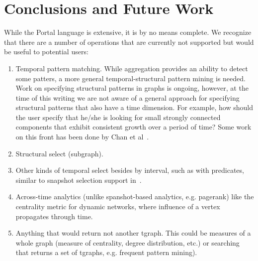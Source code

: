 \section{Conclusions and Future Work}
\label{sec:conc}

While the Portal language is extensive, it is by no means complete. We
recognize that there are a number of operations that are currently not
supported but would be useful to potential users:

\begin{enumerate}
\item Temporal pattern matching.  While aggregation provides an
  ability to detect some patters, a more general temporal-structural
  pattern mining is needed.  Work on specifying structural patterns in
  graphs is ongoing, however, at the time of this writing we are not
  aware of a general approach for specifying structural patterns that
  also have a time dimension.  For example, how should the user
  specify that he/she is looking for small strongly connected
  components that exhibit consistent growth over a period of time?
  Some work on this front has been done by Chan et
  al~\cite{Chan2008,Kan2009}.
\item Structural select (subgraph).  
\item Other kinds of temporal select besides by interval, such as with
  predicates, similar to snapshot selection support
  in~\cite{Khurana2013}. 
\item Across-time analytics (unlike spanshot-based analytics,
  e.g. pagerank) like the centrality metric for dynamic networks,
  where influence of a vertex propagates through time.
\item Anything that would return not another tgraph.  This could be
  measures of a whole graph (measure of centrality, degree
  distribution, etc.) or searching that returns a set of tgraphs,
  e.g. frequent pattern mining).
\end{enumerate}
